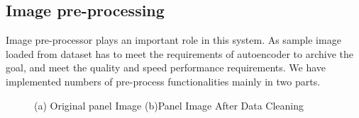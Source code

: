 \documentclass[runningheads]{llncs}
\begin{document}
\subsection{Image pre-processing}
Image pre-processor plays an important role in this system. As sample image loaded from dataset has to meet the requirements of autoencoder to archive the goal, and meet the quality and speed performance requirements.  We have implemented numbers of pre-process functionalities mainly in two parts. \\
\begin{figure}
    \centering
    \caption{ (a) Original panel Image (b)Panel Image After Data Cleaning }        
    \label{fig:3}
\end{figure}
\end{document}
